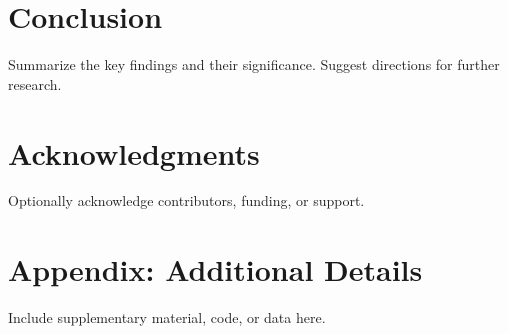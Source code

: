 \documentclass[11pt]{article}
\begin{document}
\section{Conclusion}
Summarize the key findings and their significance. Suggest directions for further research.

\section*{Acknowledgments}
Optionally acknowledge contributors, funding, or support.




\appendix
\section{Appendix: Additional Details}
Include supplementary material, code, or data here.
\end{document}
